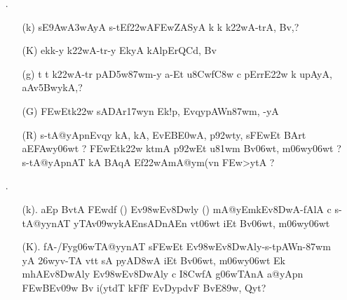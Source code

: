 \begin{itemize}
\item[{\dn \dnnum \rn{11}}.] \begin{itemize}

           \item[({\dn k})] {\dn {}s\2E\39Aw\3A3wAyA\2 s\2-tEf\322wA\3FEwZASyA\2 k\? k\? k\322wA-trA, Bv\?,{\rs ?\re}}
           
           \item[({\dn K})] {\dn ek\4k-y k\322wA-tr-y EkyA kAlpErQC\?d, Bv\?}
            
           \item[({\dn g})] {\dn t\? t\? k\322wA-tr\? pA\3D5w\387wm-y a-Et u\38Cw\?f\4\3C8w\2 c pErrE\322w\2\- k\? upAyA, aAv\35BwykA,{\rs ?\re}}
           
           \item[({\dn G})] {\dn \3FEwEtk\322w\2 sADAr\317wy\?n Ek\2!p, EvqypAWn\387wm, -yA} 
           
           \item[({\dn R})] {\dn s\2-tA@yApnEvqy\? kA, kA, EvEB\3E0wA, p\392wty, s\2\3FEwEt BArt\? aE\3FAwy\306wt\? {\rs ?\re} \3FEwEtk\322w\2 ktmA\2 p\392wEt u\381wm\2 Bv\306wt, m\306wy\306wt\? {\rs ?\re} s\2-tA@yApnAT{\rdt} kA BAqA Ef\322wAmA@ym(v\?n \3FEw>ytA {\rs ?\re}}
           \end{itemize}

\item[{\dn \dnnum \rn{12}}.]\begin{itemize}
                \item[({\dn k}).] {\dn aEp BvtA\2 \3FEwd\?f\? {\rs (\re}{\dn \dnnum {}}{\rs )\re} Ev\398wEv\38Dwly\? {\rs (\re}{\dn \dnnum {}}{\rs )\re} mA@yEmk\-Ev\38DwA{\rs -\re}fAlA c s\2-tA@yynAT\?{\qvb} yTAv\309wykAEn\break {}sADnAEn vt\0\306wt\? iEt Bv\306wt, m\306wy\306wt}
                
                \item[({\dn K}).] {\dn fA-/Fyg\5\306wTA@yynAT{\rdt} s\2\3FEwEt Ev\398wEv\38DwAly{\rs -\re}s\2-t\-pAWn{\rs -\re}\-\387wm\? yA \326wyv-TA vt\0t\?{\rs ,\re} sA pyA\0\3D8wA iEt Bv\306wt, m\306wy\306wt\? Ek mhAEv\38DwAly\? Ev\398wEv\38DwAly\? c I\38CwfA\2 g\5\306wTAnA a@yApn\2 \3FEwBEv\309w Bv\? i(y\?tdT\?{\qvb} kFfF EvD\?ypdvF BvE\389w, Qy\?t{\rs ?\re}}


\end{itemize}
\end{itemize}
